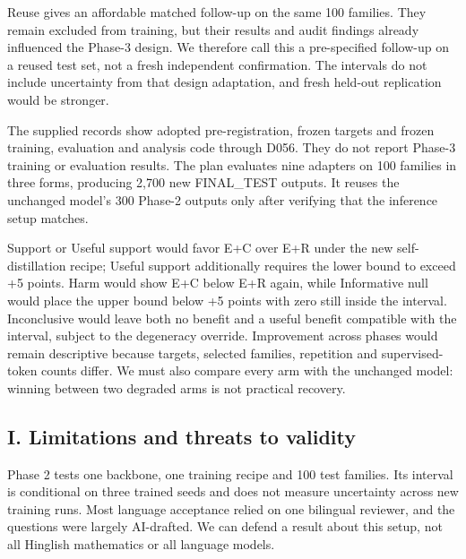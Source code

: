 Reuse gives an affordable matched follow-up on the same 100 families. They remain excluded from training, but their results and audit findings already influenced the Phase-3 design. We therefore call this a pre-specified follow-up on a reused test set, not a fresh independent confirmation. The intervals do not include uncertainty from that design adaptation, and fresh held-out replication would be stronger.

\medskip{}\par\nopagebreak

The supplied records show adopted pre-registration, frozen targets and frozen training, evaluation and analysis code through D056. They do not report Phase-3 training or evaluation results. The plan evaluates nine adapters on 100 families in three forms, producing 2,700 new FINAL\_TEST outputs. It reuses the unchanged model's 300 Phase-2 outputs only after verifying that the inference setup matches.

\medskip{}\par\nopagebreak

Support or Useful support would favor E+C over E+R under the new self-distillation recipe; Useful support additionally requires the lower bound to exceed +5 points. Harm would show E+C below E+R again, while Informative null would place the upper bound below +5 points with zero still inside the interval. Inconclusive would leave both no benefit and a useful benefit compatible with the interval, subject to the degeneracy override. Improvement across phases would remain descriptive because targets, selected families, repetition and supervised-token counts differ. We must also compare every arm with the unchanged model: winning between two degraded arms is not practical recovery.

\subsection*{I. Limitations and threats to validity}


\medskip{}\par\nopagebreak

Phase 2 tests one backbone, one training recipe and 100 test families. Its interval is conditional on three trained seeds and does not measure uncertainty across new training runs. Most language acceptance relied on one bilingual reviewer, and the questions were largely AI-drafted. We can defend a result about this setup, not all Hinglish mathematics or all language models.

